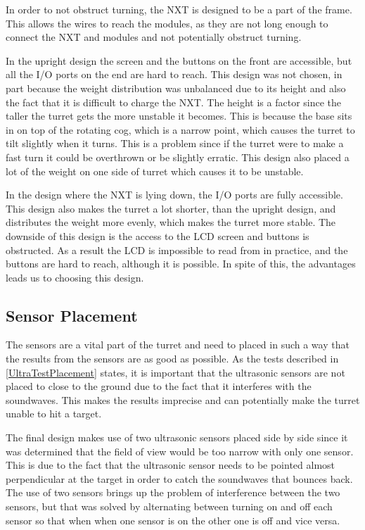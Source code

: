 In order to not obstruct turning, the NXT is designed to be a part of the
frame. This allows the wires to reach the modules, as they are not long
enough to connect the NXT and modules and not potentially obstruct
turning.\nl

In the upright design the screen and the buttons on the front
are accessible, but all the I/O ports on the end are hard to reach. This
design was not chosen, in part because the weight distribution was unbalanced due to its height and also the fact that it is difficult to
charge the NXT. The height is a factor since the taller the turret gets the
more unstable it becomes. This is because the base sits in on top of the
rotating cog, which is a narrow point, which causes the turret to tilt
slightly when it turns. This is a problem since if the turret were to make a
fast turn it could be overthrown or be slightly erratic. This design also
placed a lot of the weight on one side of turret which causes it to be
unstable.\nl

In the design where the NXT is lying down, the I/O ports are fully accessible.
This design also makes the turret a lot shorter, than the upright design, and
distributes the weight more evenly, which makes the turret more stable. The downside of this design is the access to the LCD screen and buttons is obstructed. As a result the LCD is impossible to read from in practice, and the buttons are hard to reach, although it is possible. In spite of this, the advantages leads us to choosing this design.

\subsection{Sensor Placement}
The sensors are a vital part of the turret and need to placed in such a way that
the results from the sensors are as good as possible. As the tests described in
\autoref{UltraTestPlacement} states, it is important that the ultrasonic sensors
are not placed to close to the ground due to the fact that it interferes with
the soundwaves. This makes the results imprecise and can potentially make the
turret unable to hit a target.\nl

The final design makes use of two ultrasonic sensors placed side by side since
it was determined that the field of view would be too narrow with only one
sensor. This is due to the fact that the ultrasonic sensor needs to be pointed
almost perpendicular at the target in order to catch the soundwaves that bounces
back. The use of two sensors brings up the problem of interference between the
two sensors, but that was solved by alternating between turning on and off each
sensor so that when when one sensor is on the other one is off and vice
versa.\nl

